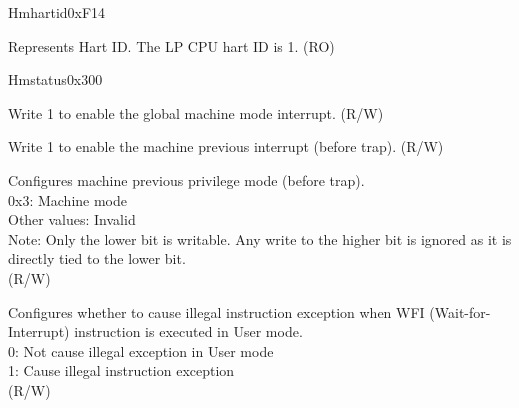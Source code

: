 \begin{register}{H}{mhartid}{0xF14}\label{regdesc:LPMHARTID}
%
\regnewline%
\begin{regdesc}\begin{reglist}
\label{fielddesc:LPMHARTID}\item [MHARTID] Represents Hart ID. The LP CPU hart ID is 1. (RO)
\end{reglist}\end{regdesc}
\end{register}

\begin{register}{H}{mstatus}{0x300}\label{regdesc:LPMSTATUS}
%
%
%
%
%
%
%
%
%
\regnewline%
\begin{regdesc}\begin{reglist}
\label{fielddesc:LPMSTATUSMIE}\item [MIE] Write 1 to enable the global machine mode interrupt. (R/W)
\label{fielddesc:LPMSTATUSMPIE}\item [MPIE] Write 1 to enable the machine previous interrupt (before trap). (R/W)
\label{fielddesc:LPMSTATUSMPP}\item [MPP] Configures machine previous privilege mode (before trap).\\
0x3: Machine mode\\
Other values: Invalid\\
Note: Only the lower bit is writable. Any write to the higher bit is ignored as it is directly tied to the lower bit.\\
(R/W)
\label{fielddesc:LPMSTATUSTW}\item [TW] Configures whether to cause illegal instruction exception when WFI (Wait-for-Interrupt) instruction is executed in User mode. \\
0: Not cause illegal exception in User mode\\
1: Cause illegal instruction exception\\
(R/W)
\end{reglist}\end{regdesc}
\end{register}

